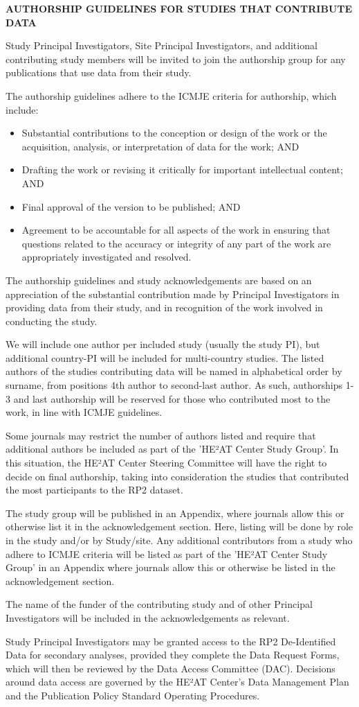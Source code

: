 \documentclass[12pt,letterpaper]{article}
\begin{document}
\textbf{AUTHORSHIP GUIDELINES FOR STUDIES THAT CONTRIBUTE DATA}

Study Principal Investigators, Site Principal Investigators, and additional contributing study members will be invited to join the authorship group for any publications that use data from their study.

The authorship guidelines adhere to the ICMJE criteria for authorship, which include:
\begin{itemize}
    \item Substantial contributions to the conception or design of the work or the acquisition, analysis, or interpretation of data for the work; AND
    \item Drafting the work or revising it critically for important intellectual content; AND
    \item Final approval of the version to be published; AND
    \item Agreement to be accountable for all aspects of the work in ensuring that questions related to the accuracy or integrity of any part of the work are appropriately investigated and resolved.
\end{itemize}

The authorship guidelines and study acknowledgements are based on an appreciation of the substantial contribution made by Principal Investigators in providing data from their study, and in recognition of the work involved in conducting the study.

We will include one author per included study (usually the study PI), but additional country-PI will be included for multi-country studies. The listed authors of the studies contributing data will be named in alphabetical order by surname, from positions 4th author to second-last author. As such, authorships 1-3 and last authorship will be reserved for those who contributed most to the work, in line with ICMJE guidelines.

Some journals may restrict the number of authors listed and require that additional authors be included as part of the 'HE²AT Center Study Group'. In this situation, the HE²AT Center Steering Committee will have the right to decide on final authorship, taking into consideration the studies that contributed the most participants to the RP2 dataset.

The study group will be published in an Appendix, where journals allow this or otherwise list it in the acknowledgement section. Here, listing will be done by role in the study and/or by Study/site. Any additional contributors from a study who adhere to ICMJE criteria will be listed as part of the 'HE²AT Center Study Group' in an Appendix where journals allow this or otherwise be listed in the acknowledgement section.

The name of the funder of the contributing study and of other Principal Investigators will be included in the acknowledgements as relevant.

Study Principal Investigators may be granted access to the RP2 De-Identified Data for secondary analyses, provided they complete the Data Request Forms, which will then be reviewed by the Data Access Committee (DAC). Decisions around data access are governed by the HE²AT Center's Data Management Plan and the Publication Policy Standard Operating Procedures.
\end{document}

